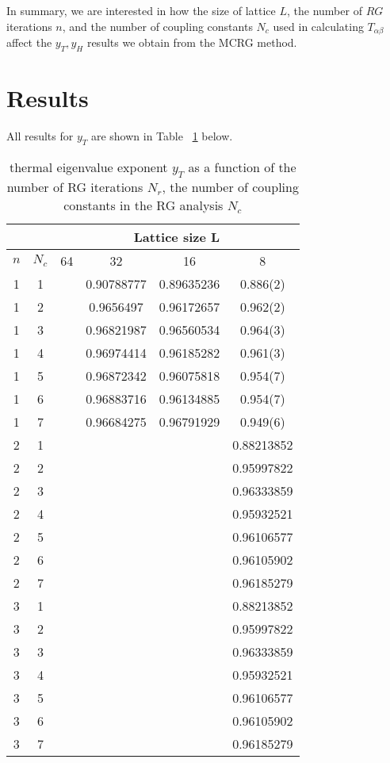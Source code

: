 \documentclass{article}
\begin{document}
In summary, we are interested in how the size of lattice $L$, the number of $RG$ iterations $n$, and the number of coupling constants $N_c$ used in calculating $T_{\alpha\beta}$ affect the $y_T, y_H$ results we obtain from the MCRG method.

\section{Results}
All results for $y_T$ are shown in Table ~\ref{yT} below.
\begin{table}[H]
\centering
\begin{tabular}{|c|c|c|c|c|c|} 
\hline
 \multicolumn{2}{|c|}{ }& \multicolumn{4}{c|}{Lattice size L}\\
 \hline
 $n$ & $N_c$ & 64 & 32 & 16 & 8 \\
 \hline
 1 & 1 & & 0.90788777& 0.89635236 & 0.886(2)\\
 1 & 2 & & 0.9656497 & 0.96172657 & 0.962(2)\\
 1 & 3 & & 0.96821987& 0.96560534 & 0.964(3)\\
 1 & 4 & & 0.96974414 & 0.96185282 & 0.961(3)\\
 1 & 5 & & 0.96872342 & 0.96075818 & 0.954(7)\\
 1 & 6 & & 0.96883716 & 0.96134885 & 0.954(7)\\
 1 & 7 & & 0.96684275 & 0.96791929 & 0.949(6)\\
 \hline
 2 & 1 & & & & 0.88213852\\
 2 & 2 & & & & 0.95997822\\
 2 & 3 & & & & 0.96333859\\
 2 & 4 & & & & 0.95932521\\
 2 & 5 & & & & 0.96106577\\
 2 & 6 & & & & 0.96105902\\
 2 & 7 & & & & 0.96185279\\
 \hline
 3 & 1 & & & & 0.88213852\\
 3 & 2 & & & & 0.95997822\\
 3 & 3 & & & & 0.96333859\\
 3 & 4 & & & & 0.95932521\\
 3 & 5 & & & & 0.96106577\\
 3 & 6 & & & & 0.96105902\\
 3 & 7 & & & & 0.96185279\\
 \hline
 \end{tabular}
 \caption{\label{yT}thermal eigenvalue
exponent $y_T$ as a function of the number of RG iterations $N_r$, the number of coupling
constants in the RG analysis $N_c$}
\end{table}
\end{document}
